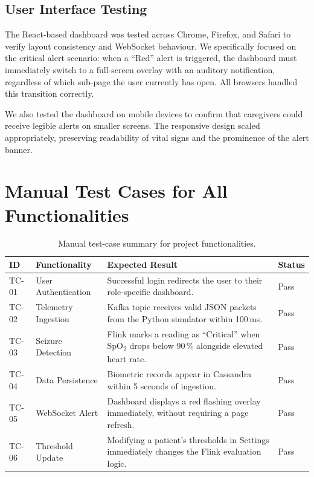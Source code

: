 \documentclass[12pt, a4paper, oneside]{report}
\begin{document}
\subsection{User Interface Testing}
The React-based dashboard was tested across Chrome, Firefox, and Safari to verify layout consistency and WebSocket behaviour. We specifically focused on the critical alert scenario: when a ``Red'' alert is triggered, the dashboard must immediately switch to a full-screen overlay with an auditory notification, regardless of which sub-page the user currently has open. All browsers handled this transition correctly.

We also tested the dashboard on mobile devices to confirm that caregivers could receive legible alerts on smaller screens. The responsive design scaled appropriately, preserving readability of vital signs and the prominence of the alert banner.

\section{Manual Test Cases for All Functionalities}

\begin{table}[h!]
\centering
\caption{Manual test-case summary for project functionalities.}
\label{tab:testcases}
\small
\begin{tabular}{|p{1.2cm}|p{3.5cm}|p{4.5cm}|p{1.5cm}|}
\hline
\textbf{ID} & \textbf{Functionality} & \textbf{Expected Result} & \textbf{Status} \\ \hline
TC-01 & User Authentication & Successful login redirects the user to their role-specific dashboard. & Pass \\ \hline
TC-02 & Telemetry Ingestion & Kafka topic receives valid JSON packets from the Python simulator within 100\,ms. & Pass \\ \hline
TC-03 & Seizure Detection & Flink marks a reading as ``Critical'' when SpO\textsubscript{2} drops below 90\,\% alongside elevated heart rate. & Pass \\ \hline
TC-04 & Data Persistence & Biometric records appear in Cassandra within 5 seconds of ingestion. & Pass \\ \hline
TC-05 & WebSocket Alert & Dashboard displays a red flashing overlay immediately, without requiring a page refresh. & Pass \\ \hline
TC-06 & Threshold Update & Modifying a patient's thresholds in Settings immediately changes the Flink evaluation logic. & Pass \\ \hline
\end{tabular}
\end{table}
\end{document}
